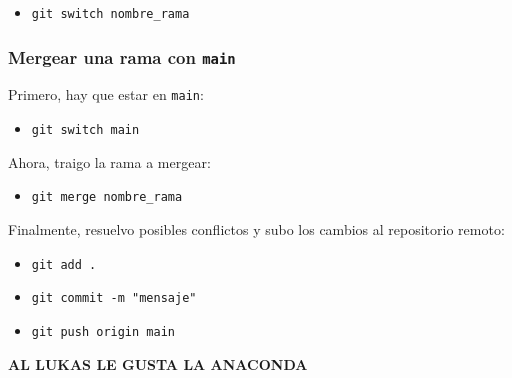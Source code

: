 \documentclass{article} %
\begin{document}
\begin{itemize}
    \item \texttt{git switch nombre\_rama}
\end{itemize}

\subsubsection{Mergear una rama con \texttt{main}}

Primero, hay que estar en \texttt{main}:

\begin{itemize}
    \item \texttt{git switch main}
\end{itemize}

Ahora, traigo la rama a mergear:

\begin{itemize}
    \item \texttt{git merge nombre\_rama}
\end{itemize}

Finalmente, resuelvo posibles conflictos y subo los cambios al repositorio remoto:

\begin{itemize}
    \item \texttt{git add .}
    \item \texttt{git commit -m "mensaje"}
    \item \texttt{git push origin main}
\end{itemize}

\huge\textbf{AL LUKAS LE GUSTA LA ANACONDA}
\end{document}
